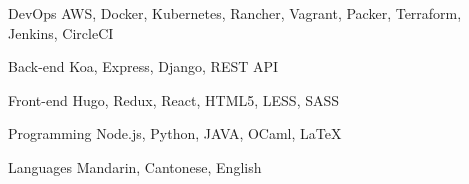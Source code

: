 

\begin{cvskills}

  \cvskill
  {DevOps} %
  {AWS, Docker, Kubernetes, Rancher, Vagrant, Packer, Terraform, Jenkins, CircleCI} %

  \cvskill
  {Back-end} %
  {Koa, Express, Django, REST API} %

  \cvskill
  {Front-end} %
  {Hugo, Redux, React, HTML5, LESS, SASS} %

  \cvskill
  {Programming} %
  {Node.js, Python, JAVA, OCaml, LaTeX} %

  \cvskill
  {Languages} %
  {Mandarin, Cantonese, English} %

\end{cvskills}
